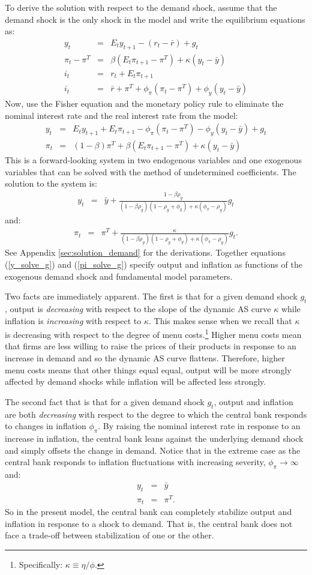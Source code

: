 \documentclass[12pt,fleqn]{article}
\newcommand{\EE}{\begin{eqnarray}}
\newcommand{\FF}{\end{eqnarray}}
\begin{document}
To derive the solution with respect to the demand shock, assume that the demand shock is the only shock in the model and write the equilibrium equations as:
	\EE
	y_t & = & E_t y_{t+1}  - \left( r_{t} - \bar{r}\right) + g_t\\
	\pi_t -\pi^T & = & \beta \left( E_t\pi_{t+1} - \pi^T\right)  + \kappa (y_t -\bar{y})\\
	i_{t} & = & r_{t} + E_t \pi_{t+1}\\
	i_{t} & = & \bar{r} + \pi^T + \phi_{\pi}\left(\pi_t - \pi^T\right) + \phi_y \left(y_t - \bar{y}\right)
	\FF
Now, use the Fisher equation and the monetary policy rule to eliminate the nominal interest rate and the real interest rate from the model:
	\EE
	y_t & = & E_t y_{t+1} + E_t\pi_{t+1}  - \phi_{\pi}\left(\pi_t - \pi^T\right) - \phi_y \left(y_t - \bar{y}\right)
+ g_t\\
	\pi_t & = & (1-\beta) \pi^T + \beta \left( E_t\pi_{t+1} - \pi^T\right)  + \kappa (y_t -\bar{y})
	\FF
This is a forward-looking system in two endogenous variables and one exogenous variables that can be solved with the method of undetermined coefficients. The solution to the system is:
	\EE
	y_t & = &\bar{y} + \frac{1-\beta\rho_g}{(1-\beta \rho_g)(1-\rho_g+\phi_y) + \kappa (\phi_{\pi} - \rho_g)}g_t \label{y_solve_g}
	\FF
and:
	\EE
	\pi_t & = & \pi^T + \frac{\kappa}{(1-\beta \rho_g)(1-\rho_g+\phi_y) + \kappa (\phi_{\pi} - \rho_g)} g_t.\label{pi_solve_g}
	\FF
See Appendix \ref{sec:solution_demand} for the derivations. Together equations (\ref{y_solve_g}) and (\ref{pi_solve_g}) specify output and inflation as functions of the exogenous demand shock and fundamental model parameters.

Two facts are immediately apparent. The first is that for a given demand shock $g_t$, output is \emph{decreasing} with respect to the slope of the dynamic
AS curve $\kappa$ while inflation is \emph{increasing} with respect to $\kappa$. This makes sense when we recall that $\kappa$ is decreasing with respect to the degree of menu costs.\footnote{Specifically: $\kappa \equiv \eta/\phi$.} Higher menu costs mean that firms are less willing to raise the prices of their products in response to an increase in demand and so the dynamic AS curve flattens. Therefore, higher menu costs means that other things equal equal, output will be more strongly affected by demand shocks while inflation will be affected less strongly.

The second fact that is that for a given demand shock $g_t$, output and inflation are both \emph{decreasing} with respect to the degree to which the central bank responds to changes in inflation $\phi_{\pi}$. By raising the nominal interest rate in response to an increase in inflation, the central bank leans against the underlying demand shock and simply offsets the change in demand. Notice that in the extreme case as the central bank responds to inflation fluctuations with increasing severity, $\phi_{\pi}\rightarrow\infty$ and:
	\EE
	y_t   & = &\bar{y}\\
	\pi_t & = & \pi^T.
	\FF
So in the present model, the central bank can completely stabilize output and inflation in response to a shock to demand. That is, the central bank does not face a trade-off between stabilization of one or the other.
\end{document}
